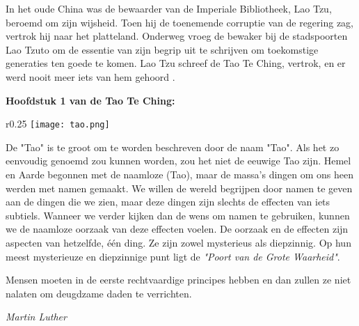 \documentclass[11pt]{article}
\begin{document}
In het oude China was de bewaarder van de Imperiale Bibliotheek, Lao Tzu, beroemd om zijn wijsheid. Toen hij de toenemende corruptie van de regering zag, vertrok hij naar het platteland. Onderweg vroeg de bewaker bij de stadspoorten Lao Tzuto om de essentie van zijn begrip uit te schrijven om toekomstige generaties ten goede te komen. Lao Tzu schreef de Tao Te Ching, vertrok, en er werd nooit meer iets van hem gehoord \cite{tao_introduction}.

\medskip
\begin{center}
\textbf{\cite{tao_chapter1} Hoofdstuk 1 van de Tao Te Ching:}
\end{center}

\begin{wrapfigure}[20]{r}{0.25\textwidth}
    \centering
    \vspace{-45pt}
    \texttt{[image: tao.png]}
\end{wrapfigure}

\noindent
\vspace{-10pt}
\begin{flushright}
De "Tao" is te groot om te worden beschreven door de naam "Tao". Als het zo eenvoudig genoemd zou kunnen worden, zou het niet de eeuwige Tao zijn.\vspace{10pt}\linebreak
Hemel en Aarde begonnen met de naamloze (Tao), maar de massa's 
dingen om ons heen werden met namen gemaakt.\vspace{10pt}\linebreak
We willen de wereld begrijpen door namen te geven aan de dingen die we zien, maar deze dingen zijn slechts de effecten van iets subtiels.\vspace{10pt}\linebreak
Wanneer we verder kijken dan de wens om namen te gebruiken, kunnen we de naamloze oorzaak van deze effecten voelen. \vspace{10pt}\linebreak
De oorzaak en de effecten zijn aspecten van hetzelfde, één ding. Ze zijn zowel mysterieus als diepzinnig.\vspace{20pt}\linebreak
Op hun meest mysterieuze en diepzinnige punt ligt de \textit{"Poort van de Grote Waarheid"}.
\end{flushright}

\epigraph{Mensen moeten in de eerste rechtvaardige principes hebben en dan zullen ze niet nalaten om deugdzame daden te verrichten.}{\textit{\footnotesize{Martin Luther}}}
\end{document}
